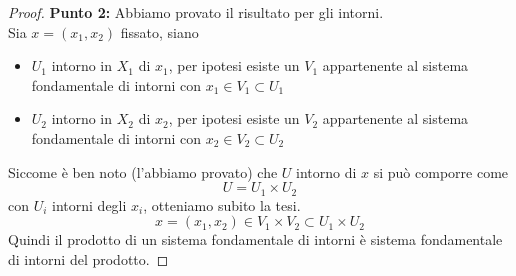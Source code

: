 \begin{proof} \textbf{Punto 2:} Abbiamo provato il risultato per gli intorni. \\ Sia $x=(x_1,x_2)$ fissato, siano
	\begin{itemize}
		\item $U_1$ intorno in $X_1$ di $x_1$, per ipotesi esiste un $V_1$ appartenente al sistema fondamentale di intorni con $x_1 \in V_1 \subset U_1$
		\item $U_2$ intorno in $X_2$ di $x_2$, per ipotesi esiste un $V_2$ appartenente al sistema fondamentale di intorni con $x_2 \in V_2 \subset U_2$
	\end{itemize}
	Siccome è ben noto (l'abbiamo provato) che $U$ intorno di $x$ si può comporre come
	\begin{equation*}
	U =U_{1}\times U_{2}
	\end{equation*}
	con $U_{i}$ intorni degli $x_i$, otteniamo subito la tesi.
	\begin{equation*}
	x=(x_1,x_2) \in V_1 \times V_2 \subset U_1 \times U_2
	\end{equation*}
	 Quindi il prodotto di un sistema fondamentale di intorni è sistema fondamentale di intorni del prodotto.
\end{proof}

